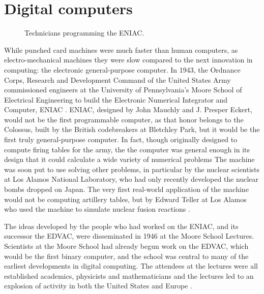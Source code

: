 \documentclass[../../main.tex]{subfiles}
\begin{document}
\section{Digital computers}

\begin{figure}[ht]
    \caption{Technicians programming the ENIAC.}
    \label{fig:eniac}
\end{figure}

While punched card machines were much faster than human computers, as electro-mechanical machines they were slow compared to the next innovation in computing: the electronic general-purpose computer.
In 1943, the Ordnance Corps, Research and Development Command of the United States Army commissioned engineers at the University of Pennsylvania's Moore School of Electrical Engineering
to build the Electronic Numerical Integrator and Computer, ENIAC \cite{sep-computing-history}\cite{reed1952}.
ENIAC, designed by John Mauchly and J. Presper Eckert, would not be the first programmable computer, as that honor belongs to the Colossus,
built by the British codebreakers at Bletchley Park\cite{winegrad1996}, but it would be the first truly general-purpose computer.
In fact, though originally designed to compute firing tables for the army, the the computer was general enough in its design that it could calculate a wide variety of numerical problems \cite{10.2307/2002620}
The machine was soon put to use solving other problems, in particular by the nuclear scientists at Los Alamos National Laboratory, who had only recently developed the nuclear bombs dropped on Japan.
The very first real-world application of the machine would not be computing artillery tables, but by Edward Teller at Los Alamos who used the machine to simulate nuclear fusion reactions \cite{AtomicHeritageFoundation}.

The ideas developed by the people who had worked on the ENIAC, and its successor the EDVAC, were disseminated in 1946 at the Moore School Lectures.
Scientists at the Moore School had already begun work on the EDVAC, which would be the first binary computer,
and the school was central to many of the earliest developments in digital computing.
The attendees at the lectures were all established academics, physicists and mathematicians and the lectures led to an explosion of activity in both the United States and Europe \cite{Davis2008}.
\end{document}
